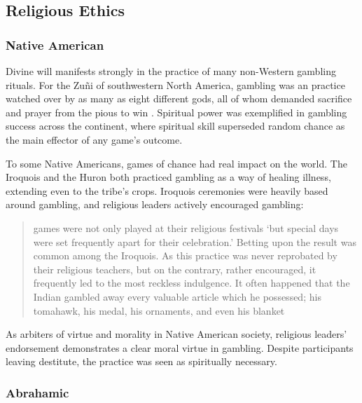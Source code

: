 \documentclass{../../../coursework}
\begin{document}
\subsection{Religious Ethics}

\subsubsection{Native American}

Divine will manifests strongly in the practice of many non-Western gambling rituals. For the Zuñi of southwestern North America, gambling was an practice watched over by as many as eight different gods, all of whom demanded sacrifice and prayer from the pious to win \parencite{Ste03,Bin07}. Spiritual power was exemplified in gambling success across the continent, where spiritual skill superseded random chance as the main effector of any game's outcome.

To some Native Americans, games of chance had real impact on the world. The Iroquois \parencite{Bea96} and the Huron \parencite{Her56} both practiced gambling as a way of healing illness, extending even to the tribe's crops. Iroquois ceremonies were heavily based around gambling, and religious leaders actively encouraged gambling:

\begin{quote}
    games were not only played at their religious festivals `but special days were set frequently apart for their celebration.' Betting upon the result was common among the Iroquois. As this practice was never reprobated by their religious teachers, but on the contrary, rather encouraged, it frequently led to the most reckless indulgence. It often happened that the Indian gambled away every valuable article which he possessed; his tomahawk, his medal, his ornaments, and even his blanket
    
    \parencite[116]{Cul07}
\end{quote}

As arbiters of virtue and morality in Native American society, religious leaders' endorsement demonstrates a clear moral virtue in gambling. Despite participants leaving destitute, the practice was seen as spiritually necessary.

\subsubsection{Abrahamic}
\end{document}
